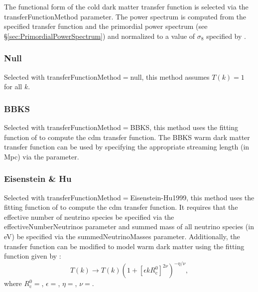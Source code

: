The functional form of the cold dark matter transfer function is selected via the {\normalfont \ttfamily transferFunctionMethod} parameter. The power spectrum is computed from the specified transfer function and the primordial power spectrum (see \S\ref{sec:PrimordialPowerSpectrum}) and normalized to a value of $\sigma_8$ specified by {\normalfont \ttfamily [sigma\_8]}.

\subsubsection{Null}

Selected with {\normalfont \ttfamily transferFunctionMethod}$=${\normalfont \ttfamily null}, this method assumes $T(k)=1$ for all $k$.

\subsubsection{BBKS}

Selected with {\normalfont \ttfamily transferFunctionMethod}$=${\normalfont \ttfamily BBKS}, this method uses the fitting function of \cite{bardeen_statistics_1986} to compute the \gls{cdm} transfer function. The BBKS warm dark matter transfer function can be used by specifying the appropriate streaming length (in Mpc) via the {\normalfont \ttfamily [transferFunctionWDMFreeStreamingLength]} parameter.

\subsubsection{Eisenstein \& Hu}

Selected with {\normalfont \ttfamily transferFunctionMethod}$=${\normalfont \ttfamily Eisenstein-Hu1999}, this method uses the fitting function of \cite{eisenstein_power_1999} to compute the \gls{cdm} transfer function. It requires that the effective number of neutrino species be specified via the {\normalfont \ttfamily effectiveNumberNeutrinos} parameter and summed mass of all neutrino species (in eV) be specified via the {\normalfont \ttfamily summedNeutrinoMasses} parameter. Additionally, the transfer function can be modified to model warm dark matter using the fitting function given by \cite{barkana_constraints_2001}:
\begin{equation}
T(k) \rightarrow T(k) (1+[\epsilon k R_{\mathrm c}^0]^{2\nu})^{-\eta/\nu},
\end{equation}
where $R_{\mathrm c}^0=${\normalfont \ttfamily [transferFunctionWdmCutOffScale]}, $\epsilon=${\normalfont \ttfamily [transferFunctionWdmEpsilon]}, $\eta=${\normalfont \ttfamily [transferFunctionWdmEta]}, $\nu=${\normalfont \ttfamily [transferFunctionWdmNu]}.

